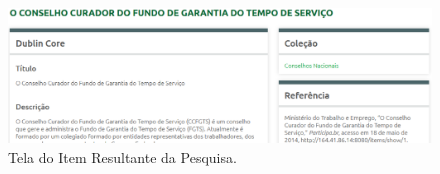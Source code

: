 \graphicspath{{figuras/prototipo/}}
\begin{figure}[H]
\centering
\includegraphics[width=1.0\textwidth]{resultante-pesquisa}
\caption{Tela do Item Resultante da Pesquisa.}
\label{fig:resulpesquisa_prototipo}
\end{figure}



